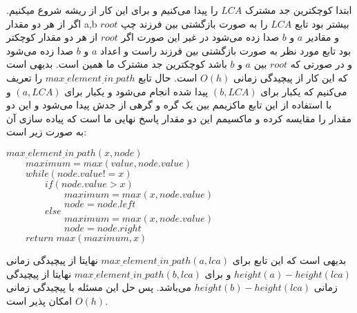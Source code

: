 ابتدا کوچکترین جد مشترک
$LCA$
 را پیدا می‌کنیم و برای این کار از ریشه شروع میکنیم. اگر از هر دو مقدار a,b بیشتر بود تابع 
$LCA$
  را به صورت بازگشتی بین فرزند چپ 
$root$
   و مقادیر 
   $a$
    و
    $b$
     صدا زده می‌شود در غیر این صورت اگر 
$root$
     از هر دو مقدار کوچکتر بود تابع مورد نظر به صورت بازگشتی بین فرزند راست و اعداد 
   $a$
    و
    $b$
        صدا زده می‌شود و در صورتی که
 $root$      
         بین
    $a$
    و
    $b$
            باشد کوچکترین جد مشترک ما همین است. بدیهی است که این کار از پیچیدگی زمانی 
$O(h)$
             است.
حال تابع 
$max \underline \; element \underline \; in  \underline \; path$
 را تعریف می‌کنیم که یکبار برای 
 $(b, LCA)$
  پیدا شده انجام می‌شود و یکبار برای 
 $(a, LCA)$
   و با استفاده از این تابع ماکزیمم بین یک گره و گرهی از جدش پیدا می‌شود و این دو مقدار را مقایسه کرده و ماکسیمم این دو مقدار پاسخ نهایی ما است که پیاده سازی آن به صورت زیر است:
\begin{flushleft}
$max \underline \; element \underline \; in  \underline \; path(x, node)$\\
    $\qquad maximum = max(value, node.value)$\\
    $\qquad while(node.value ! = x)$\\
           $\qquad \qquad if(node.value > x)$\\
                 $\qquad \qquad \qquad maximum = max(x, node.value)$\\
                 $\qquad \qquad \qquad node = node.left$\\
           $\qquad \qquad else$\\
                 $\qquad \qquad \qquad maximum = max(x, node.value)$\\
                 $\qquad \qquad \qquad node = node.right$\\
    $\qquad return \; max(maximum, x)$\\
 \end{flushleft}
\begin{flushright}
بدیهی است که این تابع برای 
$max \underline \; element \underline \; in  \underline \; path(a, lca)$
 نهایتا از پیچیدگی زمانی
$height(a)  - height(lca)$
و برای 
$max \underline \; element \underline \; in  \underline \; path(b, lca)$
 نهایتا از پیچیدگی زمانی
$height(b)  - height(lca)$
می‌باشد.
 پس  حل این مسئله با پیچیدگی زمانی
$O(h)$
  امکان پذیر است.
  \end{flushright}
